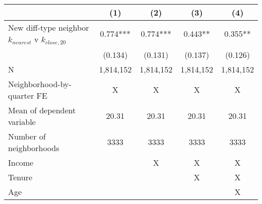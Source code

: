 \begin{tabular}{lcccc}
\toprule
  & (1) & (2) & (3) & (4) \\ 
\midrule
New diff-type neighbor $k_{nearest}$ v $k_{close,20}$ & 0.774*** & 0.774*** & 0.443** & 0.355** \\ 
 & (0.134) & (0.131) & (0.137) & (0.126) \\ 
 \midrule
N & 1,814,152 & 1,814,152 & 1,814,152 & 1,814,152 \\ 
Neighborhood-by-quarter FE & X & X & X & X \\ 
Mean of dependent variable & 20.31 & 20.31 & 20.31 & 20.31 \\ 
Number of neighborhoods & 3333 & 3333 & 3333 & 3333 \\ 
Income &  & X & X & X \\ 
Tenure &  &  & X & X \\ 
Age &  &  &  & X \\ 
\bottomrule
\end{tabular}